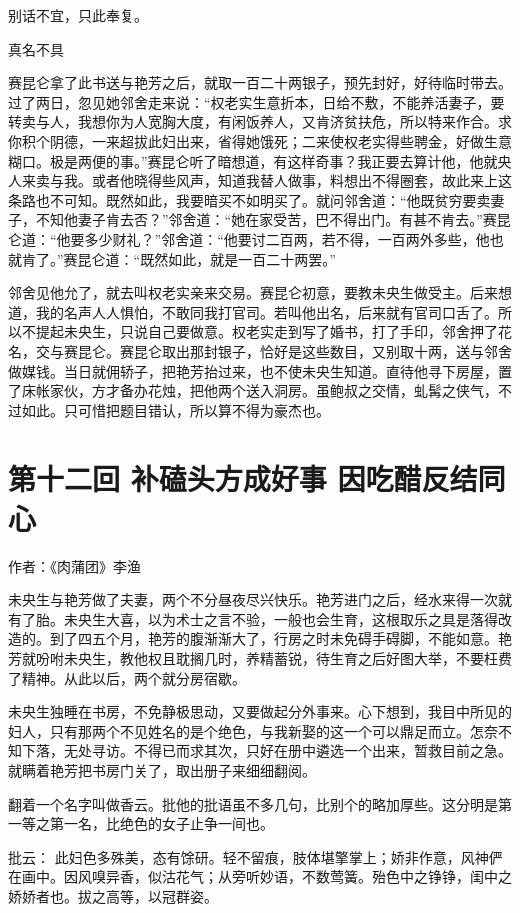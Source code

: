 \documentclass[a4paper,12pt,UTF8,twoside]{ctexbook}
\begin{document}
别话不宜，只此奉复。

真名不具

赛昆仑拿了此书送与艳芳之后，就取一百二十两银子，预先封好，好待临时带去。过了两日，忽见她邻舍走来说：“权老实生意折本，日给不敷，不能养活妻子，要转卖与人，我想你为人宽胸大度，有闲饭养人，又肯济贫扶危，所以特来作合。求你积个阴德，一来超拔此妇出来，省得她饿死；二来使权老实得些聘金，好做生意糊口。极是两便的事。”赛昆仑听了暗想道，有这样奇事？我正要去算计他，他就央人来卖与我。或者他晓得些风声，知道我替人做事，料想出不得圈套，故此来上这条路也不可知。既然如此，我要暗买不如明买了。就问邻舍道：“他既贫穷要卖妻子，不知他妻子肯去否？”邻舍道：“她在家受苦，巴不得出门。有甚不肯去。”赛昆仑道：“他要多少财礼？”邻舍道：“他要讨二百两，若不得，一百两外多些，他也就肯了。”赛昆仑道：“既然如此，就是一百二十两罢。”

邻舍见他允了，就去叫权老实亲来交易。赛昆仑初意，要教未央生做受主。后来想道，我的名声人人惧怕，不敢同我打官司。若叫他出名，后来就有官司口舌了。所以不提起未央生，只说自己要做意。权老实走到写了婚书，打了手印，邻舍押了花名，交与赛昆仑。赛昆仑取出那封银子，恰好是这些数目，又别取十两，送与邻舍做媒钱。当日就佣轿子，把艳芳抬过来，也不使未央生知道。直待他寻下房屋，置了床帐家伙，方才备办花烛，把他两个送入洞房。虽鲍叔之交情，虬髯之侠气，不过如此。只可惜把题目错认，所以算不得为豪杰也。

\chapter{第十二回 补磕头方成好事 因吃醋反结同心}

作者：《肉蒲团》李渔

未央生与艳芳做了夫妻，两个不分昼夜尽兴快乐。艳芳进门之后，经水来得一次就有了胎。未央生大喜，以为术士之言不验，一般也会生育，这根取乐之具是落得改造的。到了四五个月，艳芳的腹渐渐大了，行房之时未免碍手碍脚，不能如意。艳芳就吩咐未央生，教他权且耽搁几时，养精蓄锐，待生育之后好图大举，不要枉费了精神。从此以后，两个就分房宿歇。

未央生独睡在书房，不免静极思动，又要做起分外事来。心下想到，我目中所见的妇人，只有那两个不见姓名的是个绝色，与我新娶的这一个可以鼎足而立。怎奈不知下落，无处寻访。不得已而求其次，只好在册中遴选一个出来，暂救目前之急。就瞒着艳芳把书房门关了，取出册子来细细翻阅。

翻着一个名字叫做香云。批他的批语虽不多几句，比别个的略加厚些。这分明是第一等之第一名，比绝色的女子止争一间也。

批云：
此妇色多殊美，态有馀研。轻不留痕，肢体堪擎掌上；娇非作意，风神俨在画中。因风嗅异香，似沽花气；从旁听妙语，不数莺簧。殆色中之铮铮，闺中之娇娇者也。拔之高等，以冠群姿。
\end{document}
